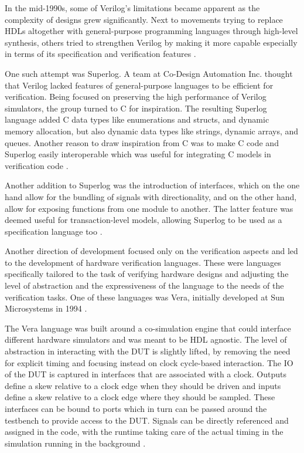 In the mid-1990s, some of Verilog's limitations became apparent as the complexity of designs grew significantly. Next
to movements trying to replace HDLs altogether with general-purpose programming languages through high-level
synthesis, others tried to strengthen Verilog by making it more capable especially in terms of its specification and
verification features \cite{flake2020a}.

One such attempt was Superlog. A team at Co-Design Automation Inc. thought that Verilog lacked features of
general-purpose languages to be efficient for verification. Being focused on preserving the high performance of Verilog
simulators, the group turned to C for inspiration. The resulting Superlog language added C data types like enumerations and
structs, and dynamic memory allocation, but also dynamic data types like strings, dynamic arrays, and queues. Another
reason to draw inspiration from C was to make C code and Superlog easily interoperable which was useful for
integrating C models in verification code \cite{flake2020a}.

Another addition to Superlog was the introduction of interfaces, which on the one hand allow for the bundling of signals
with directionality, and on the other hand, allow for exposing functions from one module to another. The latter
feature was deemed useful for transaction-level models, allowing Superlog to be used as a specification language too
\cite{flake2020a}.

Another direction of development focused only on the verification aspects and led to the development of hardware
verification languages. These were languages specifically tailored to the task of verifying hardware designs
and adjusting the level of abstraction and the expressiveness of the language to the needs of the verification tasks. One of
these languages was Vera, initially developed at Sun Microsystems in 1994 \cite{flake2020a}.

The Vera language was built around a co-simulation engine that could interface different hardware simulators and
was meant to be HDL agnostic. The level of abstraction in interacting with the DUT is slightly lifted, by removing
the need for explicit timing and focusing instead on clock cycle-based interaction. The IO of the DUT is captured in
interfaces that are associated with a clock. Outputs define a skew relative to a clock edge when they should be
driven and inputs define a skew relative to a clock edge where they should be sampled. These interfaces can be
bound to ports which in turn can be passed around the testbench to provide access to the DUT. Signals can be directly
referenced and assigned in the code, with the runtime taking care of the actual timing in the simulation running in
the background \cite{flake2020a}.

